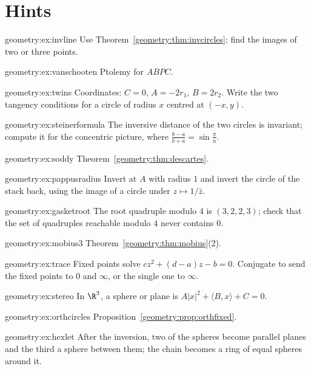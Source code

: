 \section{Hints}

\begin{hint}{geometry:ex:invline}
Use Theorem~\ref{geometry:thm:invcircles}; find the images of two or three points.
\end{hint}
\begin{hint}{geometry:ex:vanschooten}
Ptolemy for $ABPC$.
\end{hint}
\begin{hint}{geometry:ex:twins}
Coordinates: $C=0$, $A=-2r_1$, $B=2r_2$. Write the two tangency conditions for a circle of radius $x$ centred at $(-x,y)$.
\end{hint}
\begin{hint}{geometry:ex:steinerformula}
The inversive distance of the two circles is invariant; compute it for the concentric picture, where $\frac{b-a}{b+a}=\sin\frac\pi n$.
\end{hint}
\begin{hint}{geometry:ex:soddy}
Theorem~\ref{geometry:thm:descartes}.
\end{hint}
\begin{hint}{geometry:ex:pappusradius}
Invert at $A$ with radius $1$ and invert the circle of the stack back, using the image of a circle under $z\mapsto1/\bar z$.
\end{hint}
\begin{hint}{geometry:ex:gasketroot}
The root quadruple modulo $4$ is $(3,2,2,3)$; check that the set of quadruples reachable modulo $4$ never contains $0$.
\end{hint}
\begin{hint}{geometry:ex:mobius3}
Theorem~\ref{geometry:thm:mobius}(2).
\end{hint}
\begin{hint}{geometry:ex:trace}
Fixed points solve $cz^2+(d-a)z-b=0$. Conjugate to send the fixed points to $0$ and $\infty$, or the single one to $\infty$.
\end{hint}
\begin{hint}{geometry:ex:stereo}
In $\R^3$, a sphere or plane is $A|x|^2+\langle B,x\rangle+C=0$.
\end{hint}
\begin{hint}{geometry:ex:orthcircles}
Proposition~\ref{geometry:prop:orthfixed}.
\end{hint}
\begin{hint}{geometry:ex:hexlet}
After the inversion, two of the spheres become parallel planes and the third a sphere between them; the chain becomes a ring of equal spheres
around it.
\end{hint}

